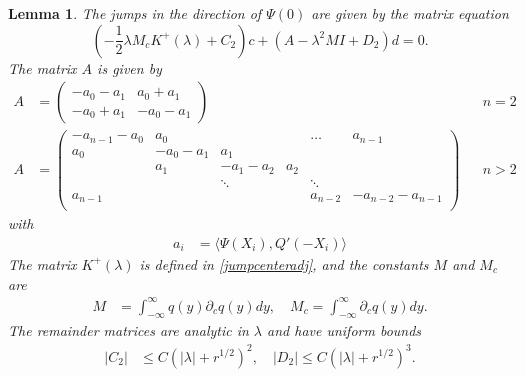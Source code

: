 \documentclass[10pt,reqno]{amsart}
\theoremstyle{plain}
\newtheorem{lemma}[theorem]{Lemma}
\theoremstyle{definition}
\theoremstyle{remark}
\numberwithin{theorem}{section}
\numberwithin{equation}{section}
\begin{document}
\begin{lemma}\label{jumpadj}
The jumps in the direction of $\Psi(0)$ are given by the matrix equation
\begin{equation}\label{Psimatrix}
\left( -\frac{1}{2} \lambda M_c K^+(\lambda) + C_2 \right)c + \left(A - \lambda^2 M I + D_2\right)d = 0.
\end{equation}
The matrix $A$ is given by
\begin{align*}
A &= \begin{pmatrix}
-a_0 -a_1 & a_0 + a_1  \\
-a_0 + a_1 & -a_0 - a_1
\end{pmatrix} && n = 2 \\
A &= \begin{pmatrix}
-a_{n-1} - a_0 & a_0 & & & \dots & a_{n-1}\\
a_0 & -a_0 - a_1 &  a_1   \\
& a_1 & -a_1 - a_2 &  a_2 \\
& & \ddots & & \ddots \\
a_{n-1} & & & & a_{n-2} & -a_{n-2} - a_{n-1} \\
\end{pmatrix} && n > 2
\end{align*}
with
\begin{align*}
a_i &= \langle \Psi(X_i), Q'(-X_i) \rangle
\end{align*}
The matrix $K^+(\lambda)$ is defined in \cref{jumpcenteradj}, and the constants $M$ and $M_c$ are
\begin{align*}
M &= \int_{-\infty}^\infty q(y) \partial_c q(y) dy, \quad
M_c = \int_{-\infty}^\infty \partial_c q(y) dy.
\end{align*}
The remainder matrices are analytic in $\lambda$ and have uniform bounds
\begin{align}\label{adjjumprem}
|C_2| &\leq C (|\lambda| + r^{1/2})^2, \quad
|D_2| \leq C (|\lambda| + r^{1/2})^3.
\end{align}


\end{lemma}
\end{document}
